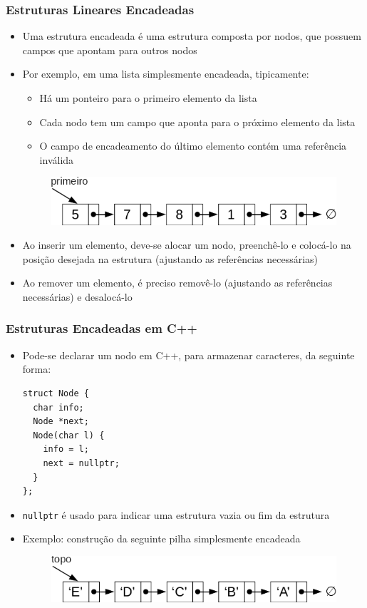 \documentclass[aspectratio=169]{beamer}
\begin{document}
\begin{frame}\frametitle{Estruturas Lineares Encadeadas}
\begin{itemize}
	\item Uma estrutura encadeada é uma estrutura composta por nodos, que possuem campos que apontam para outros nodos
	\item Por exemplo, em uma lista simplesmente encadeada, tipicamente:
	\begin{itemize}
		\item Há um ponteiro para o primeiro elemento da lista
		\item Cada nodo tem um campo que aponta para o próximo elemento da lista
		\item O campo de encadeamento do último elemento contém uma referência inválida
	\end{itemize}
\begin{figure}[h]
	\centering
	\includegraphics[height=0.15\paperheight]{imagens/lista_simplesmente_encadeada2.png}
\end{figure}
	\item Ao inserir um elemento, deve-se alocar um nodo, preenchê-lo e colocá-lo na posição desejada na estrutura (ajustando as referências necessárias)
	\item Ao remover um elemento, é preciso removê-lo (ajustando as referências necessárias) e desalocá-lo
\end{itemize}
\end{frame}

\begin{frame}[fragile]\frametitle{Estruturas Encadeadas em C++}
\begin{itemize}
	\item Pode-se declarar um nodo em C++, para armazenar caracteres, da seguinte forma:
\begin{lstlisting}[basicstyle=\ttfamily\scriptsize]
struct Node {
  char info;
  Node *next;
  Node(char l) {
    info = l;
    next = nullptr;
  }
};
\end{lstlisting}
	\item \texttt{nullptr} é usado para indicar uma estrutura vazia ou fim da estrutura
	\item Exemplo: construção da seguinte pilha simplesmente encadeada
\begin{figure}[h]
	\centering
	\includegraphics[height=0.15\paperheight]{imagens/pilha_simplesmente_encadeada.png}
\end{figure}
\end{itemize}
\end{frame}
\end{document}
